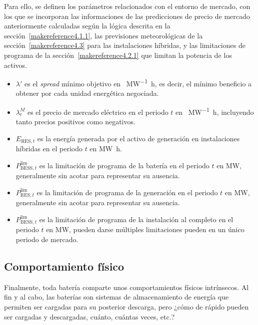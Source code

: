 Para ello, se definen los parámetros relacionados con el entorno de mercado, con los que se incorporan las informaciones de las predicciones de precio de mercado anteriormente calculadas según la lógica descrita en la sección~\ref{makereference4.1.1}, las previsiones meteorológicas de la sección~\ref{makereference4.3} para las instalaciones híbridas, y las limitaciones de programa de la sección~\ref{makereference4.2.1} que limitan la potencia de los activos.

\begin{itemize}

  \item \( \lambda' \) es el \textit{spread} mínimo objetivo en \si{\text{\euro}\per\mega\watt\hour}, es decir, el mínimo beneficio a obtener por cada unidad energética negociada.

  \item \( \lambda^{M}_{t} \) es el precio de mercado eléctrico en el periodo \( t \) en \si{\text{\euro}\per\mega\watt\hour}, incluyendo tanto precios positivos como negativos.

  \item \( E_{\text{RES}, t} \) es la energía generada por el activo de generación en instalaciones híbridas en el periodo \( t \) en \si{{\mega\watt\hour}}.

  \item \( P^{\text{lim}}_{\text{BESS}, t} \) es la limitación de programa de la batería en el periodo \( t \) en \si{\mega\watt}, generalmente sin acotar para representar su ausencia.

  \item \( P^{\text{lim}}_{\text{RES}, t} \) es la limitación de programa de la generación en el periodo \( t \) en \si{\mega\watt}, generalmente sin acotar para representar su ausencia.

  \item \( P^{\text{lim}}_{\text{BESS}, t} \) es la limitación de programa de la instalación al completo en el periodo \( t \) en \si{\mega\watt}, pueden darse múltiples limitaciones pueden en un único periodo de mercado.

\end{itemize}

\subsection{Comportamiento físico}%
\label{makereference5.1.5}

Finalmente, toda batería comparte unos comportamientos físicos intrínsecos. Al fin y al cabo, las baterías son sistemas de almacenamiento de energía que permiten ser cargadas para su posterior descarga, pero ¿cómo de rápido pueden ser cargadas y descargadas, cuánto, cuántas veces, etc.?

